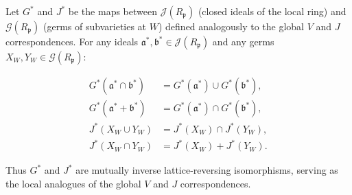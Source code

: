 Let $G^*$ and $J^*$ be the maps between $\mathcal{J}(R_{\mathfrak{p}})$ (closed ideals of the local ring) and $\mathcal{G}(R_{\mathfrak{p}})$ (germs of subvarieties at $W$) defined analogously to the global $V$ and $J$ correspondences. For any ideals $\mathfrak{a}^*, \mathfrak{b}^* \in \mathcal{J}(R_{\mathfrak{p}})$ and any germs $X_W, Y_W \in \mathcal{G}(R_{\mathfrak{p}})$:

\begin{align}
G^*(\mathfrak{a}^* \cap \mathfrak{b}^*) &= G^*(\mathfrak{a}^*) \cup G^*(\mathfrak{b}^*), \\
G^*(\mathfrak{a}^* + \mathfrak{b}^*) &= G^*(\mathfrak{a}^*) \cap G^*(\mathfrak{b}^*), \\
J^*(X_W \cup Y_W) &= J^*(X_W) \cap J^*(Y_W), \\
J^*(X_W \cap Y_W) &= J^*(X_W) + J^*(Y_W).
\end{align}

Thus $G^*$ and $J^*$ are mutually inverse lattice-reversing isomorphisms, serving as the local analogues of the global $V$ and $J$ correspondences.
